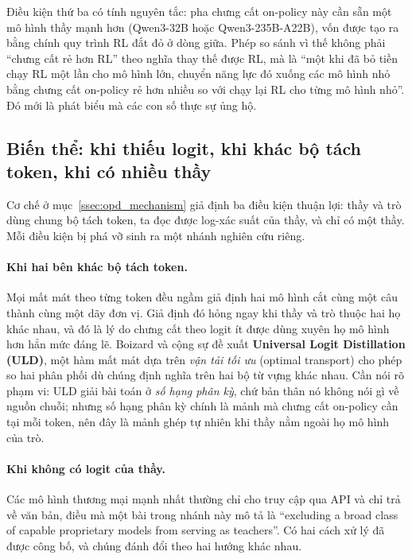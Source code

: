 Điều kiện thứ ba có tính nguyên tắc: pha chưng cất on-policy này cần sẵn một mô hình thầy mạnh hơn (Qwen3-32B hoặc Qwen3-235B-A22B), vốn được tạo ra bằng chính quy trình RL đắt đỏ ở dòng giữa. Phép so sánh vì thế không phải ``chưng cất rẻ hơn RL'' theo nghĩa thay thế được RL, mà là ``một khi đã bỏ tiền chạy RL một lần cho mô hình lớn, chuyển năng lực đó xuống các mô hình nhỏ bằng chưng cất on-policy rẻ hơn nhiều so với chạy lại RL cho từng mô hình nhỏ''. Đó mới là phát biểu mà các con số thực sự ủng hộ.

\subsection{Biến thể: khi thiếu logit, khi khác bộ tách token, khi có nhiều thầy}
\label{ssec:opd_variants}

Cơ chế ở mục~\ref{ssec:opd_mechanism} giả định ba điều kiện thuận lợi: thầy và trò dùng chung bộ tách token, ta đọc được log-xác suất của thầy, và chỉ có một thầy. Mỗi điều kiện bị phá vỡ sinh ra một nhánh nghiên cứu riêng.

\paragraph{Khi hai bên khác bộ tách token.} Mọi mất mát theo từng token đều ngầm giả định hai mô hình cắt cùng một câu thành cùng một dãy đơn vị. Giả định đó hỏng ngay khi thầy và trò thuộc hai họ khác nhau, và đó là lý do chưng cất theo logit ít được dùng xuyên họ mô hình hơn hẳn mức đáng lẽ. Boizard và cộng sự \cite{boizard2025uld} đề xuất \textbf{Universal Logit Distillation (ULD)}, một hàm mất mát dựa trên \emph{vận tải tối ưu} (optimal transport) cho phép so hai phân phối dù chúng định nghĩa trên hai bộ từ vựng khác nhau. Cần nói rõ phạm vi: ULD giải bài toán ở \emph{số hạng phân kỳ}, chứ bản thân nó không nói gì về nguồn chuỗi; nhưng số hạng phân kỳ chính là mảnh mà chưng cất on-policy cần tại mỗi token, nên đây là mảnh ghép tự nhiên khi thầy nằm ngoài họ mô hình của trò.

\paragraph{Khi không có logit của thầy.} Các mô hình thương mại mạnh nhất thường chỉ cho truy cập qua API và chỉ trả về văn bản, điều mà một bài trong nhánh này mô tả là ``excluding a broad class of capable proprietary models from serving as teachers''. Có hai cách xử lý đã được công bố, và chúng đánh đổi theo hai hướng khác nhau.

